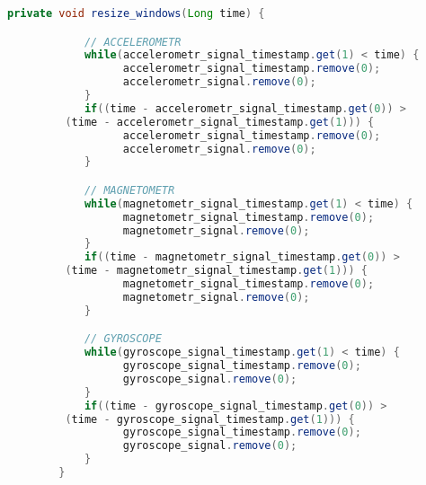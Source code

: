 \begin{lstlisting}[language=Java,  basicstyle=\footnotesize]
     private void resize_windows(Long time) {

            // ACCELEROMETR
            while(accelerometr_signal_timestamp.get(1) < time) {
                  accelerometr_signal_timestamp.remove(0);
                  accelerometr_signal.remove(0);
            }
            if((time - accelerometr_signal_timestamp.get(0)) >
         (time - accelerometr_signal_timestamp.get(1))) {
                  accelerometr_signal_timestamp.remove(0);
                  accelerometr_signal.remove(0);
            }

            // MAGNETOMETR
            while(magnetometr_signal_timestamp.get(1) < time) {
                  magnetometr_signal_timestamp.remove(0);
                  magnetometr_signal.remove(0);
            }
            if((time - magnetometr_signal_timestamp.get(0)) >
         (time - magnetometr_signal_timestamp.get(1))) {
                  magnetometr_signal_timestamp.remove(0);
                  magnetometr_signal.remove(0);
            }

            // GYROSCOPE
            while(gyroscope_signal_timestamp.get(1) < time) {
                  gyroscope_signal_timestamp.remove(0);
                  gyroscope_signal.remove(0);
            }
            if((time - gyroscope_signal_timestamp.get(0)) >
         (time - gyroscope_signal_timestamp.get(1))) {
                  gyroscope_signal_timestamp.remove(0);
                  gyroscope_signal.remove(0);
            }
        }
\end{lstlisting}